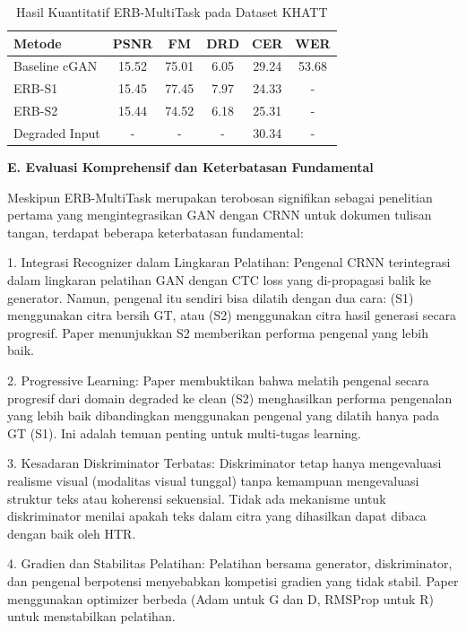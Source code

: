 \begin{table}[H]
\centering
\caption{Hasil Kuantitatif ERB-MultiTask pada Dataset KHATT}
\label{tab:erb-results}
\small
\begin{tabular}{|l|c|c|c|c|c|}
\hline
\textbf{Metode} & \textbf{PSNR} & \textbf{FM} & \textbf{DRD} & \textbf{CER} & \textbf{WER} \\
\hline
Baseline cGAN & 15.52 & 75.01 & 6.05 & 29.24 & 53.68 \\
ERB-S1 & 15.45 & 77.45 & 7.97 & 24.33 & - \\
ERB-S2 & 15.44 & 74.52 & 6.18 & 25.31 & - \\
Degraded Input & - & - & - & 30.34 & - \\
\hline
\end{tabular}
\end{table}

\noindent\textbf{E. Evaluasi Komprehensif dan Keterbatasan Fundamental}

Meskipun ERB-MultiTask merupakan terobosan signifikan sebagai penelitian pertama yang mengintegrasikan GAN dengan CRNN untuk dokumen tulisan tangan, terdapat beberapa keterbatasan fundamental:

1. Integrasi Recognizer dalam Lingkaran Pelatihan:
Pengenal CRNN terintegrasi dalam lingkaran pelatihan GAN dengan CTC loss yang di-propagasi balik ke generator. Namun, pengenal itu sendiri bisa dilatih dengan dua cara: (S1) menggunakan citra bersih GT, atau (S2) menggunakan citra hasil generasi secara progresif. Paper menunjukkan S2 memberikan performa pengenal yang lebih baik.

2. Progressive Learning:
Paper membuktikan bahwa melatih pengenal secara progresif dari domain degraded ke clean (S2) menghasilkan performa pengenalan yang lebih baik dibandingkan menggunakan pengenal yang dilatih hanya pada GT (S1). Ini adalah temuan penting untuk multi-tugas learning.

3. Kesadaran Diskriminator Terbatas:
Diskriminator tetap hanya mengevaluasi realisme visual (modalitas visual tunggal) tanpa kemampuan mengevaluasi struktur teks atau koherensi sekuensial. Tidak ada mekanisme untuk diskriminator menilai apakah teks dalam citra yang dihasilkan dapat dibaca dengan baik oleh HTR.

4. Gradien dan Stabilitas Pelatihan:
Pelatihan bersama generator, diskriminator, dan pengenal berpotensi menyebabkan kompetisi gradien yang tidak stabil. Paper menggunakan optimizer berbeda (Adam untuk G dan D, RMSProp untuk R) untuk menstabilkan pelatihan.

